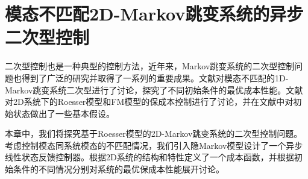 
\chapter{模态不匹配2D-Markov跳变系统的异步二次型控制}
	二次型控制也是一种典型的控制方法，近年来，Markov跳变系统的二次型控制问题也得到了广泛的研究并取得了一系列的重要成果\cite{ji1990controllability,costa1999constrained,do2016quadratic}。文献\cite{zabala2019detector}对模态不匹配的1D-Markov跳变系统二次型进行了讨论，探究了不同初始条件的最优成本性能。文献\cite{guan2001robust,dhawan2007optimal,dhawan2010lmi}对2D系统下的Roesser模型和FM模型的保成本控制进行了讨论，并在文献中对初始状态做出了一些基本假设。
	
	本章中，我们将探究基于Roesser模型的2D-Markov跳变系统的二次型控制问题。考虑控制模态同系统模态的不匹配情况，我们引入隐Markov模型设计了一个异步线性状态反馈控制器。根据2D系统的结构和特性定义了一个成本函数，并根据初始条件的不同情况分别对系统的最优保成本性能展开讨论。

